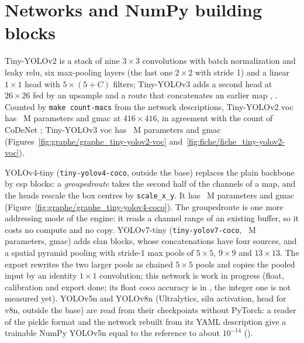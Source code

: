 \documentclass[11pt,a4paper]{article}
\begin{document}
\begin{table}[htbp]
\caption{Published results () and this work.}
\label{tab:benchmarks}
\scriptsize{}
\end{table}


\section{Networks and NumPy building blocks}\label{sec:networks}

Tiny-YOLOv2 is a stack of nine $3\times3$ convolutions with batch normalization and leaky
\gls{relu}, six max-pooling layers (the last one $2\times2$ with stride 1) and a linear
$1\times1$ head with $5\times(5+C)$ filters; Tiny-YOLOv3 adds a second head at
$26\times26$ fed by an \gls{upsample} and a route that concatenates an earlier map
\cite[\#005.0]{1804.02767}, \cite[\#016.2]{2023-zhai}. Counted by \texttt{make count-macs}
from the network descriptions, Tiny-YOLOv2 \gls{voc} has ~M parameters
and  \gls{gmac} at $416\times416$, in agreement with the count of
CoDeNet \cite[\#025.0]{2006.08357}; Tiny-YOLOv3 \gls{voc} has ~M
parameters and  \gls{gmac} (Figures~\ref{fig:graphe/graphe_tiny-yolov2-voc}
and~\ref{fig:fiche/fiche_tiny-yolov2-voc}).


YOLOv4-tiny (\texttt{tiny-yolov4-coco}, outside the \gls{base}) replaces the plain backbone by
\gls{csp} blocks: a \emph{\gls{groupedroute}} takes the second half of the channels of a map, and the
heads rescale the box centres by \texttt{scale\_x\_y}. It has ~M
parameters and  \gls{gmac} (Figure~\ref{fig:graphe/graphe_tiny-yolov4-coco}).
The \gls{groupedroute} is one more addressing mode of the engine: it reads a channel range of an
existing buffer, so it costs no compute and no copy. YOLOv7-tiny
(\texttt{tiny-yolov7-coco}, ~M parameters,
 \gls{gmac}) adds \gls{elan} blocks, whose concatenations have four sources, and a
spatial pyramid pooling with stride-1 max pools of $5\times5$, $9\times9$ and
$13\times13$. The export rewrites the two larger pools as chained $5\times5$ pools and
copies the pooled input by an identity $1\times1$ convolution; this network is work in
progress (float, \gls{calibration} and export done; its float \gls{coco} accuracy is in
, the integer one is not measured yet). YOLOv5n and
YOLOv8n (Ultralytics, \gls{silu} activation,  head for v8n, outside the \gls{base}) are read
from their checkpoints without PyTorch: a reader of the pickle format and the network
rebuilt from its YAML description give a trainable NumPy YOLOv5n equal to the reference to
about $10^{-14}$ ().
\end{document}
